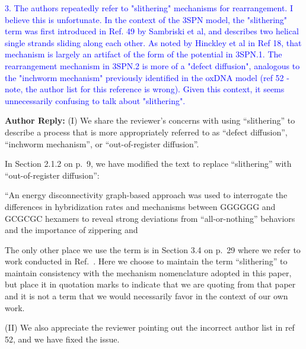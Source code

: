 \documentclass[11pt,a4paper]{letter} %
\newcommand*{\rood}[1]{{\color{red}{#1}}}
\begin{document}
\textcolor{blue}{3.  The authors repeatedly refer to "slithering" mechanisms for rearrangement. I believe this is unfortunate. In the context of the 3SPN model, the "slithering" term was first introduced in Ref. 49 by Sambriski et al, and describes two helical single strands sliding along each other. As noted by Hinckley et al in Ref 18, that mechanism is largely an artifact of the form of the potential in 3SPN.1. The rearrangement mechanism in 3SPN.2 is more of a "defect diffusion", analogous to the "inchworm mechanism" previously identified in the oxDNA model (ref 52 - note, the author list for this reference is wrong). Given this context, it seems unnecessarily confusing to talk about "slithering".}

\textbf{Author Reply:}    (I) We share the reviewer's concerns with using ``slithering'' to describe a process that is more appropriately referred to as ``defect diffusion'', ``inchworm mechanism'', or ``out-of-register diffusion''.

In Section 2.1.2 on p.~9, we have modified the text to replace ``slithering'' with ``out-of-register diffusion'':

``An energy disconnectivity graph-based approach was used to interrogate the differences in hybridization rates and mechanisms between GGGGGG and GCGCGC hexamers to reveal strong deviations from ``all-or-nothing'' behaviors and the importance of zippering and \rood{out-of-register diffusion mechanisms.~\citep{Xiao2019}''}

The only other place we use the term is in Section 3.4 on p.~29 where we refer to work conducted in Ref.~\citep{Xiao2019}. Here we choose to maintain the term ``slithering'' to maintain consistency with the mechanism nomenclature adopted in this paper, but place it in quotation marks to indicate that we are quoting from that paper and it is not a term that we would necessarily favor in the context of our own work.

\rood{``Out-of-register states for 5$^\prime$-GCGCGC-3$^\prime$ hexamers were identified as deep kinetic traps along the hybridization pathway and ``slithering'' through these states did not provide a significant hybridization pathway compared to an alternative ``zippering'' mechanism. (In contrast, out-of-register slithering and in-register zippering served as two parallel pathways for hybridization of 5$^\prime$-GGGGGG-3$^\prime$.)'' }

(II) We also appreciate the reviewer pointing out the incorrect author list in ref 52, and we have fixed the issue.
\end{document}
